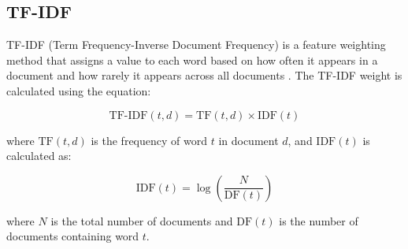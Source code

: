 \subsection{TF-IDF}

TF-IDF (Term Frequency-Inverse Document Frequency) is a feature weighting method that assigns a value to each word based on how often it appears in a document and how rarely it appears across all documents \cite{manning2008}. The TF-IDF weight is calculated using the equation:

\begin{equation}
\text{TF-IDF}(t,d) = \text{TF}(t,d) \times \text{IDF}(t)
\end{equation}

where $\text{TF}(t,d)$ is the frequency of word $t$ in document $d$, and $\text{IDF}(t)$ is calculated as:

\begin{equation}
\text{IDF}(t) = \log\left(\frac{N}{\text{DF}(t)}\right)
\end{equation}

where $N$ is the total number of documents and $\text{DF}(t)$ is the number of documents containing word $t$.
